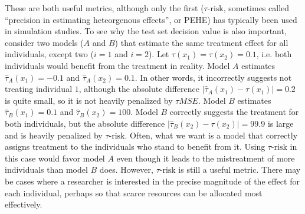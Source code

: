 These are both useful metrics, although only the first ($\tau\text{-risk}$, sometimes called ``precision in estimating heteorgenous effects'', or PEHE) has typically been used in simulation studies. To see why the test set decision value is also important, consider two models ($A$ and $B$) that estimate the same treatment effect for all individuals, except two ($i=1$ and $i=2$). Let $\tau(x_1) = \tau(x_2) = 0.1$, i.e. both individuals would benefit from the treatment in reality. Model $A$ estimates $\hat\tau_A(x_1) = -0.1$ and $\hat\tau_A(x_2) = 0.1$. In other words, it incorrectly suggests not treating individual $1$, although the absolute difference $|\hat\tau_A(x_1)-\tau(x_1)| = 0.2$ is quite small, so it is not heavily penalized by $\tau MSE$. Model $B$ estimates $\hat\tau_B(x_1) = 0.1$ and $\hat\tau_B(x_2) = 100$. Model $B$ correctly suggests the treatment for both individuals, but the absolute difference $|\hat\tau_B(x_2)-\tau(x_2)| = 99.9$ is large and is heavily penalized by $\tau\text{-risk}$. Often, what we want is a model that correctly assigns treatment to the individuals who stand to benefit from it. Using $\tau\text{-risk}$ in this case would favor model $A$ even though it leads to the mistreatment of more individuals than model $B$ does. However, $\tau\text{-risk}$ is still a useful metric. There may be cases where a researcher is interested in the precise magnitude of the effect for each individual, perhaps so that scarce resources can be allocated most effectively. 

